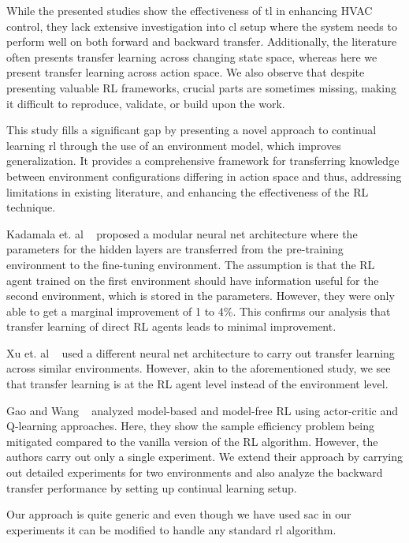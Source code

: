 \documentclass{article}
\begin{document}
While the presented studies show the effectiveness of \gls{tl} in enhancing HVAC control, they lack extensive investigation into \gls{cl} setup where the system needs to perform well on both forward and backward transfer. Additionally, the literature often presents transfer learning across changing state space, whereas here we present transfer learning across action space. We also observe that despite presenting valuable RL frameworks, crucial parts are sometimes missing, making it difficult to reproduce, validate, or build upon the work.

This study fills a significant gap by presenting a novel approach to continual learning \gls{rl} through the use of an environment model, which improves generalization.
It provides a comprehensive framework for transferring knowledge between environment configurations differing in action space and thus, addressing limitations in existing literature, and enhancing the effectiveness of the RL technique.



Kadamala et. al ~\cite{Kadamala} proposed a modular neural net architecture where the 
parameters for the hidden layers are transferred from the pre-training environment
to the fine-tuning environment. The assumption is that the RL agent trained on the first environment should have information useful for the second environment, which is stored in the parameters.
However, they were only able to get a marginal improvement of 1 to 4\%. This confirms our analysis that transfer learning of direct RL agents leads to minimal improvement. 


Xu et. al ~\cite{Xu} used a different neural net architecture to carry out
transfer learning across similar environments. However, akin to the aforementioned study,
we see that transfer learning is at the RL agent level instead of the environment
level.

Gao and Wang ~\cite{Gao} analyzed model-based and model-free RL using
actor-critic and Q-learning approaches. Here, they show the sample efficiency
problem being mitigated compared to the vanilla version of the RL algorithm.
However, the authors carry out only a single experiment. We extend their
approach by carrying out detailed experiments for two environments and also
analyze the backward transfer performance by setting up continual learning
setup.

Our approach is quite generic and even though we have used \gls{sac} in our experiments it can be modified to handle any standard \gls{rl} algorithm.
\end{document}
